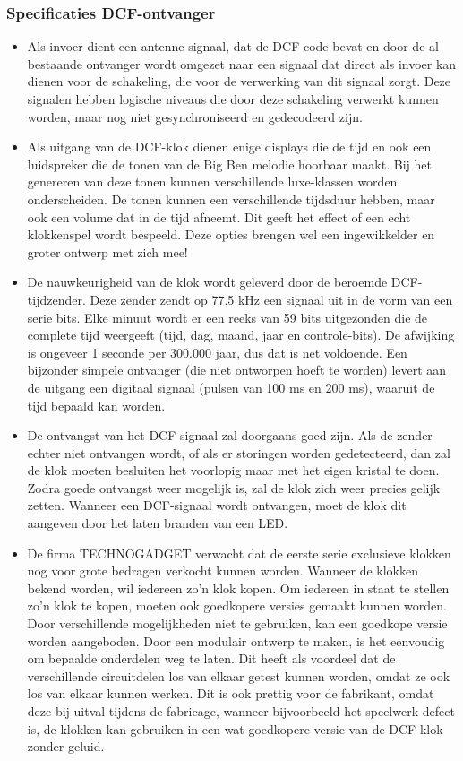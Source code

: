 \subsubsection{Specificaties DCF-ontvanger}
\begin{itemize}
\item Als invoer dient een antenne-signaal, dat de DCF-code bevat en
door de al bestaande ontvanger wordt omgezet naar een signaal
dat direct als invoer kan dienen voor de schakeling, die voor de
verwerking van dit signaal zorgt.
Deze signalen hebben logische niveaus die door deze schakeling
verwerkt kunnen worden, maar
nog niet gesynchroniseerd en gedecodeerd zijn.
\item Als uitgang van de DCF-klok dienen enige displays die de
tijd en ook een luidspreker die de tonen
van de Big Ben melodie hoorbaar maakt. Bij het
genereren van deze tonen kunnen verschillende luxe-klassen worden onderscheiden.
De tonen kunnen een verschillende tijdsduur hebben, maar ook een volume
dat in de tijd afneemt. Dit geeft het effect of een echt klokkenspel
wordt bespeeld. Deze opties brengen wel een ingewikkelder en groter
ontwerp met zich mee!
\item De nauwkeurigheid van de klok wordt geleverd door de
beroemde DCF-tijdzender.
Deze zender zendt op 77.5 kHz een signaal uit in de vorm van een serie bits.
Elke minuut wordt er een reeks van 59 bits uitgezonden die de complete tijd weergeeft (tijd, dag, maand, jaar en controle-bits).
De afwijking is ongeveer 1 seconde per 300.000 jaar, dus dat is net voldoende.
Een bijzonder simpele ontvanger (die niet ontworpen hoeft te worden) levert aan de uitgang een digitaal signaal (pulsen van 100 ms en 200 ms), waaruit de tijd bepaald kan worden.
\item De ontvangst van het DCF-signaal zal doorgaans goed zijn.
Als de zender echter niet ontvangen wordt, of als er storingen
worden gedetecteerd, dan zal de klok moeten besluiten het voorlopig
maar met het eigen kristal te doen.
Zodra goede ontvangst weer mogelijk is, zal de klok zich weer
precies gelijk zetten.
Wanneer een DCF-signaal wordt ontvangen, moet de klok dit aangeven
door het laten branden van een LED.
\item De firma TECHNOGADGET verwacht dat de eerste serie exclusieve klokken
nog voor grote bedragen verkocht kunnen worden. Wanneer de klokken bekend
worden, wil iedereen zo'n klok kopen. Om iedereen in staat te stellen zo'n
klok te kopen, moeten ook goedkopere versies gemaakt kunnen worden.
Door verschillende mogelijkheden niet te gebruiken, kan een goedkope versie worden aangeboden.
Door een modulair ontwerp te maken, is het eenvoudig om bepaalde
onderdelen weg te laten. Dit heeft als voordeel dat
de verschillende circuitdelen los van elkaar getest kunnen worden, omdat ze
ook los van elkaar kunnen werken. Dit is ook prettig voor de fabrikant, omdat
deze bij uitval tijdens de fabricage, wanneer bijvoorbeeld
het speelwerk defect is, de klokken kan gebruiken
in een wat goedkopere versie van de DCF-klok zonder geluid.
\end{itemize}

